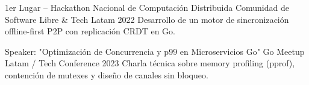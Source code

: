 %
%
%
%
%


\cvEducationItem
    {1er Lugar -- Hackathon Nacional de Computación Distribuida}
    {Comunidad de Software Libre \& Tech Latam}
    {2022}
    {Desarrollo de un motor de sincronización offline-first P2P con replicación CRDT en Go.}

\cvEducationItem
    {Speaker: "Optimización de Concurrencia y p99 en Microservicios Go"}
    {Go Meetup Latam / Tech Conference}
    {2023}
    {Charla técnica sobre memory profiling (pprof), contención de mutexes y diseño de canales sin bloqueo.}

